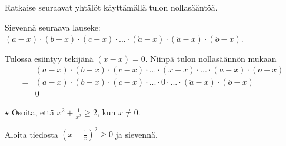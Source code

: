 \begin{tehtavasivu}
\begin{tehtava}
	\begin{vastaus}
		\begin{alakohdat}
		\end{alakohdat}
	\end{vastaus}
\end{tehtava}

\begin{tehtava}
    Ratkaise seuraavat yhtälöt käyttämällä tulon nollasääntöä.
    \begin{alakohdat}
    \end{alakohdat}
    \begin{vastaus}
        \begin{alakohdat}
        \end{alakohdat}
    \end{vastaus}
\end{tehtava}

\begin{tehtava}
    Sievennä seuraava lauseke: $(a-x)\cdot(b-x)\cdot(c-x)\cdot...\cdot(\mathring{a}-x)\cdot(\ddot{a}-x)\cdot(\ddot{o}-x)$.
    \begin{vastaus}
        Tulossa esiintyy tekijänä $(x-x)=0$. Niinpä tulon nollasäännön mukaan
        \begin{align*}
            &(a-x)\cdot(b-x)\cdot(c-x)\cdot...\cdot(x-x)\cdot...\cdot(\ddot{a}-x)\cdot(\ddot{o}-x) \\
            =&(a-x)\cdot(b-x)\cdot(c-x)\cdot...\cdot 0\cdot...\cdot(\ddot{a}-x)\cdot(\ddot{o}-x) \\
            =&0
        \end{align*}
    \end{vastaus}
\end{tehtava}



\begin{tehtava} %
$\star$ Osoita, että $x^2+\frac{1}{x^2}\geq 2$, kun $x \neq 0$.
    \begin{vastaus}
     Aloita tiedosta $\left(x-\frac{1}{x}\right)^2 \geq 0$ ja sievennä.
    \end{vastaus}
\end{tehtava}


\end{tehtavasivu}
